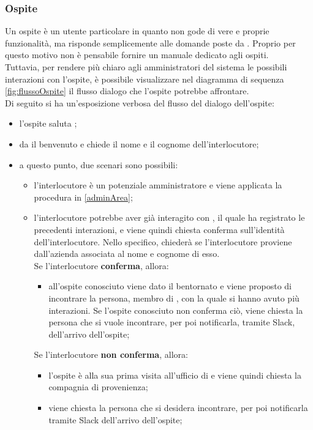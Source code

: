 \subsubsection{Ospite}
Un ospite è un utente particolare in quanto non gode di vere e proprie funzionalità, ma risponde semplicemente alle domande poste da \PROGETTO{}. Proprio per questo motivo non è pensabile fornire un manuale dedicato agli ospiti.\\
Tuttavia, per rendere più chiaro agli amministratori del sistema le possibili interazioni con l'ospite, è possibile visualizzare nel diagramma di sequenza \ref{fig:flussoOspite} il flusso dialogo che l'ospite potrebbe affrontare.\\
Di seguito si ha un'esposizione verbosa del flusso del dialogo dell'ospite:
\begin{itemize}
	\item l'ospite saluta \PROGETTO;
	\item \PROGETTO{} da il benvenuto e chiede il nome e il cognome dell'interlocutore;
	\item a questo punto, due scenari sono possibili:
	\begin{itemize}
		\item l'interlocutore è un potenziale amministratore e viene applicata la procedura in \ref{adminArea};
		\item l'interlocutore potrebbe aver già interagito con \PROGETTO, il quale ha registrato le precedenti interazioni, e viene quindi chiesta conferma sull'identità dell'interlocutore. Nello specifico, \PROGETTO{} chiederà se l'interlocutore proviene dall'azienda associata al nome e cognome di esso. \\
		Se l'interlocutore \textbf{conferma}, allora:
		\begin{itemize}
			\item all'ospite conosciuto viene dato il bentornato e viene proposto di incontrare la persona, membro di \PROPONENTE, con la quale si hanno avuto più interazioni. Se l'ospite conosciuto non conferma ciò, viene chiesta la persona che si vuole incontrare, per poi notificarla, tramite Slack, dell'arrivo dell'ospite;
		\end{itemize}
		Se l'interlocutore \textbf{non conferma}, allora:
		\begin{itemize}
			\item l'ospite è alla sua prima visita all'ufficio di \PROPONENTE e viene quindi chiesta la compagnia di provenienza;
			\item viene chiesta la persona che si desidera incontrare, per poi notificarla tramite Slack dell'arrivo dell'ospite;

\end{itemize}
\end{itemize}
\end{itemize}
